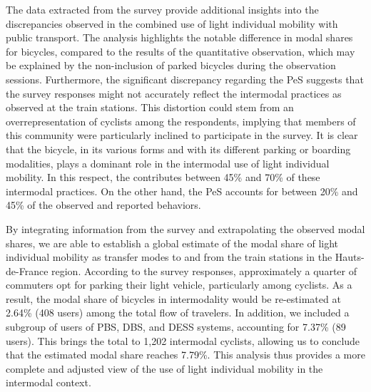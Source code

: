 \begin{refsegment}

The data extracted from the survey provide additional insights into the discrepancies observed in the combined use of light individual mobility with public transport. The analysis highlights the notable difference in modal shares for bicycles, compared to the results of the quantitative observation, which may be explained by the non-inclusion of parked bicycles during the observation sessions. Furthermore, the significant discrepancy regarding the \acrshort{PeS} suggests that the survey responses might not accurately reflect the intermodal practices as observed at the train stations. This distortion could stem from an overrepresentation of cyclists among the respondents, implying that members of this community were particularly inclined to participate in the survey. It is clear that the bicycle, in its various forms and with its different parking or boarding modalities, plays a dominant role in the intermodal use of light individual mobility. In this respect, the  contributes between 45\% and 70\% of these intermodal practices. On the other hand, the \acrshort{PeS} accounts for between 20\% and 45\% of the observed and reported behaviors.%

By integrating information from the survey and extrapolating the observed modal shares, we are able to establish a global estimate of the modal share of light individual mobility as transfer modes to and from the train stations in the Hauts-de-France region. According to the survey responses, approximately a quarter of commuters opt for parking their light vehicle, particularly among cyclists. As a result, the modal share of bicycles in \gls{intermodality} would be re-estimated at 2.64\% (408 users) among the total flow of travelers. In addition, we included a subgroup of users of \acrfull{PBS}, \acrfull{DBS}, and \acrfull{DESS} systems, accounting for 7.37\% (89 users). This brings the total to 1,202 intermodal cyclists, allowing us to conclude that the estimated modal share reaches 7.79\%. This analysis thus provides a more complete and adjusted view of the use of light individual mobility in the intermodal context.%


\end{refsegment}
